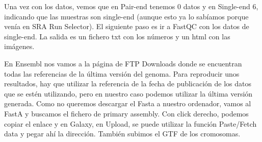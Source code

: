 Una vez con los datos, vemos que en Pair-end tenemos 0 datos y en Single-end 6, indicando que las muestras son single-end (aunque esto ya lo sabíamos porque venía en SRA Run Selector). El siguiente paso es ir a FastQC con los datos de single-end. La salida es un fichero txt con los números y un html con las imágenes.

En Ensembl nos vamos a la página de FTP Downloads donde se encuentran todas las referencias de la última versión del genoma. Para reproducir unos resultados, hay que utilizar la referencia de la fecha de publicación de los datos que se estén utilizando, pero en nuestro caso podemos utilizar la última versión generada. Como no queremos descargar el Fasta a nuestro ordenador, vamos al FastA y buscamos el fichero de primary assembly. Con click derecho, podemos copiar el enlace y en Galaxy, en Upload, se puede utilizar la función Paste/Fetch data y pegar ahí la dirección. También subimos el GTF de los cromosomas.

%
%

